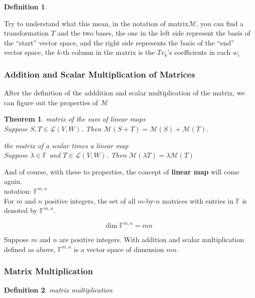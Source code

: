 \documentclass{article}
\newtheorem{theorem}{Theorem}[subsection]
\newtheorem{definition}{Definition}[subsection]
\newcommand{\FF}{\mathbb{F}}
\begin{document}
\begin{CJK}{UTF8}{gkai}
\begin{definition}
\end{definition}

Try to understand what this mean, in the notation of matrix$\mathcal{M}$, you can find a transformation $T$ and the two bases, the one in the left side represent the basis of the ``start'' vector space, and the right side represents the basis of the ``end'' vector space, the $k$-th column in the matrix is the $Tv_k$'s coefficients in each $w_i$\\


\subsubsection{Addition and Scalar Multiplication of Matrices}

After the definition of the adddition and scalar multiplication of the matrix, we can figure out the properties of $\mathcal{M}$ \\

\begin{theorem}
    matrix of the sum of linear maps\\

    Suppose $S,T \in \mathcal{L}(V,W)$. Then $\mathcal{M}(S+T) = \mathcal{M}(S)+\mathcal{M}(T)$.
    
    the matrix of a scalar times a linear map\\

    Suppose $\lambda  \in \FF$ and $T \in \mathcal{L}(V,W)$. Then $\mathcal{M}(\lambda T) = \lambda \mathcal{M}(T)$
    
\end{theorem}

And of course, with these to properties, the concept of \textbf{linear map} will come again.\\

notation: $\FF^{m,n}$\\

For $m$ and $n$ positive integers, the set of all $m$-by-$n$ matrices with entries in $\FF$ is denoted by $\FF^{m,n}$.

\[\dim\FF^{m,n} = mn\]

Suppose $m$ and $n$ are positive integers. With addition and scalar multiplication defined as above, $\FF^{m,n}$ is a vector space of dimension $mn$.\\

\subsubsection{Matrix Multiplication}
\begin{definition}
    matrix multiplication\\
    

\end{definition}
\end{CJK}
\end{document}
